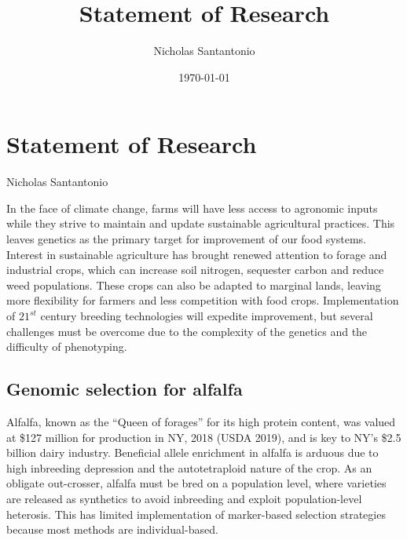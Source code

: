 \documentclass[11pt]{article}
\title{Statement of Research}
\author{Nicholas Santantonio}
\date{\today}
\begin{document}
\section*{\centering Statement of Research}
\begin{center} Nicholas Santantonio \end{center}







\noindent In the face of climate change, farms will have less access to agronomic inputs while they strive to maintain and update sustainable agricultural practices. This leaves genetics as the primary target for improvement of our food systems. Interest in sustainable agriculture has brought renewed attention to forage and industrial crops, which can increase soil nitrogen, sequester carbon and reduce weed populations. These crops can also be adapted to marginal lands, leaving more flexibility for farmers and less competition with food crops. Implementation of $21^{st}$ century breeding technologies will expedite improvement, but several challenges must be overcome due to the complexity of the genetics and the difficulty of phenotyping.%



\subsection*{Genomic selection for alfalfa}

Alfalfa, known as the ``Queen of forages'' for its high protein content, was valued at \$127 million for production in NY, 2018 (USDA 2019), and is key to NY's \$2.5 billion dairy industry. Beneficial allele enrichment in alfalfa is arduous due to high inbreeding depression and the autotetraploid nature of the crop. As an obligate out-crosser, alfalfa must be bred on a population level, where varieties are released as synthetics to avoid inbreeding and exploit population-level heterosis. This has limited implementation of marker-based selection strategies because most methods are individual-based. %
\end{document}
